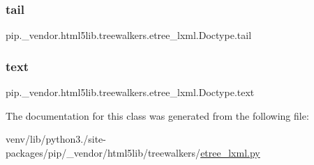 \subsubsection{\texorpdfstring{tail}{tail}}
{\footnotesize\ttfamily pip.\+\_\+vendor.\+html5lib.\+treewalkers.\+etree\+\_\+lxml.\+Doctype.\+tail}

\mbox{\label{classpip_1_1__vendor_1_1html5lib_1_1treewalkers_1_1etree__lxml_1_1Doctype_a65c2a1cda3b344c36794b16050430f7b}} 
\subsubsection{\texorpdfstring{text}{text}}
{\footnotesize\ttfamily pip.\+\_\+vendor.\+html5lib.\+treewalkers.\+etree\+\_\+lxml.\+Doctype.\+text}



The documentation for this class was generated from the following file\+:\begin{DoxyCompactItemize}
\item 
venv/lib/python3./site-\/packages/pip/\+\_\+vendor/html5lib/treewalkers/\hyperlink{treewalkers_2etree__lxml_8py}{etree\+\_\+lxml.\+py}\end{DoxyCompactItemize}
